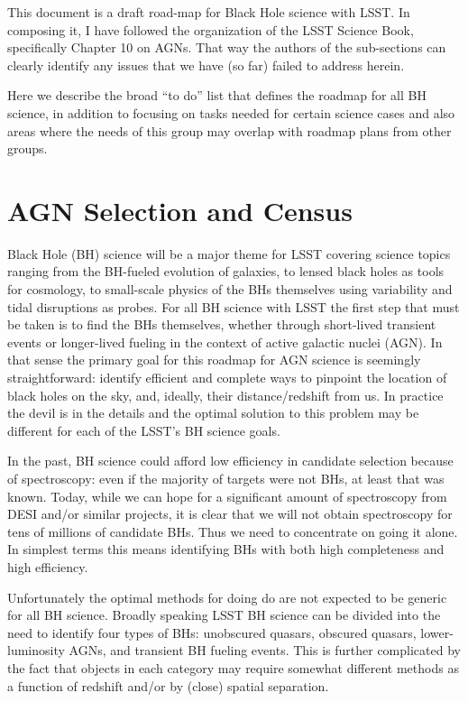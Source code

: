 This document is a draft road-map for Black Hole science with LSST.
In composing it, I have followed the organization of the LSST Science
Book, specifically Chapter 10 on AGNs.  That way the authors of the
sub-sections can clearly identify any issues that we have (so far)
failed to address herein.  

Here we describe the broad ``to do'' list that defines the roadmap for
all BH science, in addition to focusing on tasks needed for certain
science cases and also areas where the needs of this group may overlap
with roadmap plans from other groups.



\section{AGN Selection and Census}

Black Hole (BH) science will be a major theme for LSST covering
science topics ranging from the BH-fueled evolution of galaxies, to
lensed black holes as tools for cosmology, to small-scale physics of
the BHs themselves using variability and tidal disruptions as probes.
For all BH science with LSST the first step that must be taken is to
find the BHs themselves, whether through short-lived transient events
or longer-lived fueling in the context of active galactic nuclei
(AGN).  In that sense the primary goal for this roadmap for AGN
science is seemingly straightforward: identify efficient and complete
ways to pinpoint the location of black holes on the sky, and, ideally,
their distance/redshift from us.  In practice the devil is in the
details and the optimal solution to this problem may be different for
each of the LSST's BH science goals.

In the past, BH science could afford low efficiency in candidate
selection because of spectroscopy: even if the majority of targets
were not BHs, at least that was known.  Today, while we can hope for a
significant amount of spectroscopy from DESI and/or similar projects,
it is clear that we will not obtain spectroscopy for tens of millions
of candidate BHs.  Thus we need to concentrate on going it alone. In
simplest terms this means identifying BHs with both high completeness
and high efficiency.

Unfortunately the optimal methods for doing do are not expected to be
generic for all BH science.  Broadly speaking LSST BH science can be
divided into the need to identify four types of BHs: unobscured
quasars, obscured quasars, lower-luminosity AGNs, and transient BH
fueling events.  This is further complicated by the fact that objects
in each category may require somewhat different methods as a function
of redshift and/or by (close) spatial separation.

